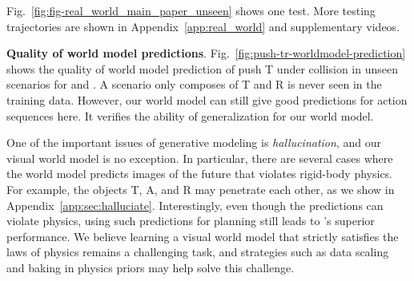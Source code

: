 Fig.~\ref{fig:fig-real_world_main_paper_unseen} shows one test. More testing trajectories are shown in Appendix~\ref{app:real_world} and supplementary videos.


\textbf{Quality of world model predictions}.
Fig.~\ref{fig:push-tr-worldmodel-prediction} shows the quality of world model prediction of push T under collision in unseen scenarios for \gpcrank and \gpcopt. A scenario only composes of T and R is never seen in the training data. However, our world model can still give good predictions for action sequences here. It verifies the ability of generalization for our world model.   

\begin{remark}[Hallucination]\label{remark:hallucination}
    One of the important issues of generative modeling is \emph{hallucination}, and our visual world model is no exception. In particular, there are several cases where the world model predicts images of the future that violates rigid-body physics. For example, the objects T, A, and R may penetrate each other, as we show in Appendix~\ref{app:sec:halluciate}. Interestingly, even though the predictions can violate physics, using such predictions for planning still leads to \nameshort's superior performance. We believe learning a visual world model that strictly satisfies the laws of physics remains a challenging task, and strategies such as data scaling and baking in physics priors may help solve this challenge.
\end{remark}














